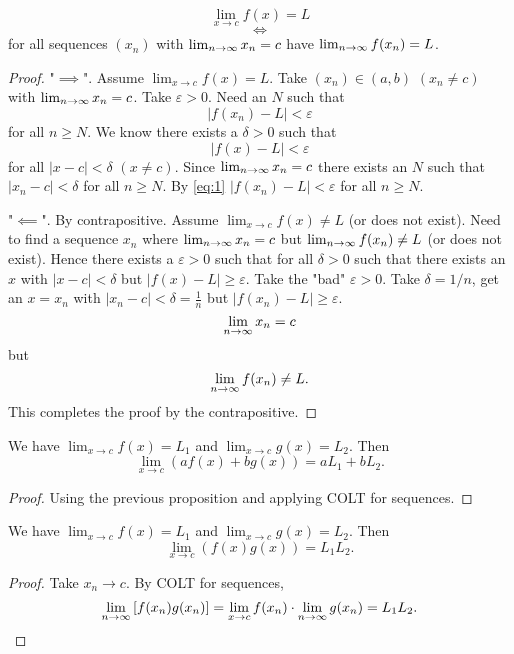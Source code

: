 \begin{proposition}\label{prop:limitfunctionandseq}
    \[
    \lim_{x \to c}f(x) = L
    \]
    \[
    \iff
    \]
    for all sequences $(x_n)$ with $\lim_{n \rightarrow \infty} x_n = c$ have $\lim_{n \rightarrow \infty} f(x_n) = L$.
\end{proposition}
\begin{proof}
    "$\implies$".
    Assume $\lim_{x \to c}f(x) = L$.
    Take $(x_n) \in (a, b)$ $(x_n \neq c)$ with $\lim_{n \rightarrow \infty} x_n = c$.
    Take $\varepsilon > 0$.
    Need an $N$ such that
    \[
    |f(x_n) - L| < \varepsilon
    \]
    for all $n \geq N$.
    We know there exists a $\delta > 0$ such that
    \begin{equation}\label{eq:1}
        |f(x) - L| < \varepsilon
    \end{equation}
    for all $|x - c| < \delta$ $(x \neq c)$.
    Since $\lim_{n \rightarrow \infty} x_n = c$ there exists an $N$ such that $|x_n - c| < \delta$ for all $n \geq N$.
    By \eqref{eq:1} $|f(x_n) - L| < \varepsilon$ for all $n \geq N$.

    "$\impliedby$".
    By contrapositive.
    Assume $\lim_{x \to c}f(x) \neq L$
    (or does not exist).
    Need to find a sequence $x_n$ where $\lim_{n \rightarrow \infty} x_n = c$ but $\lim_{n \rightarrow \infty} f(x_n) \neq L$
    (or does not exist).
    Hence there exists a $\varepsilon > 0$ such that for all $\delta > 0$ such that there exists an $x$ with $|x - c| < \delta$ but $|f(x) - L| \geq \varepsilon$.
    Take the "bad" $\varepsilon > 0$.
    Take $\delta = 1 / n$,
    get an $x = x_n$ with $|x_n - c| < \delta = \frac{1}{n}$ but $|f(x_n) - L| \geq \varepsilon$.
    \[
    \lim_{n \rightarrow \infty} x_n = c
    \]
    but
    \[
    \lim_{n \rightarrow \infty} f(x_n) \neq L.
    \]
    This completes the proof by the contrapositive.
\end{proof}

\begin{lemma}\label{lem:linearcombinationlimits}
    We have $\lim_{x \to c}f(x) = L_1$ and $\lim_{x \to c}g(x) = L_2$. Then
    \[
    \lim_{x \to c}(af(x) + bg(x)) = aL_1 + bL_2.
    \]
\end{lemma}
\begin{proof}
    Using the previous proposition and applying COLT for sequences.
\end{proof}

\begin{lemma}\label{lem:productlimits}
    We have $\lim_{x \to c}f(x) = L_1$ and $\lim_{x \to c}g(x) = L_2$. Then
    \[
    \lim_{x \to c}(f(x)g(x)) = L_1L_2.
    \]
\end{lemma}
\begin{proof}
    Take $x_n \to c$. By COLT for sequences,
    \[
    \lim_{n \rightarrow \infty}\left[f(x_n)g(x_n)\right] = \lim_{x \to c}f(x_n) \cdot \lim_{n \rightarrow \infty} g(x_n) = L_1L_2.
    \]
\end{proof}

